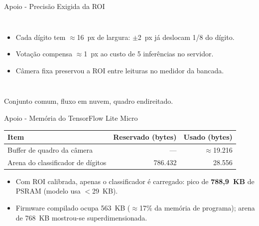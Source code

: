 \documentclass[
    aspectratio=169,
    11pt,
    brazil
]{beamer}
\newcommand{\fonteslide}[1]{\par\vfill{\tiny\color{black!60}#1\par}}
\begin{document}
\begin{frame}{Apoio - Precisão Exigida da ROI}
  \begin{columns}[c]
    \centering
    \begin{itemize}\scriptsize
      \item Cada dígito tem $\approx$16~px de largura: $\pm$2~px já deslocam 1/8 do dígito.
      \item Votação compensa $\approx$1~px ao custo de 5 inferências no servidor.
      \item Câmera fixa preservou a ROI entre leituras no medidor da bancada.
    \end{itemize}
  \end{columns}
  \fonteslide{Conjunto comum, fluxo em nuvem, quadro endireitado.}
\end{frame}

\begin{frame}{Apoio - Memória do TensorFlow Lite Micro}
  \centering
  \scriptsize
  \renewcommand{\arraystretch}{1.2}
  \begin{tabular}{@{}lrr@{}}
    \toprule
    \textbf{Item} & \textbf{Reservado (bytes)} & \textbf{Usado (bytes)} \\
    \midrule
    Buffer de quadro da câmera & --- & $\approx$19.216 \\
    Arena do classificador de dígitos & 786.432 & 28.556 \\
    \bottomrule
  \end{tabular}

  \vspace{0.3cm}
  \begin{itemize}\scriptsize
    \item Com ROI calibrada, apenas o classificador é carregado: pico de \textbf{788,9~KB} de PSRAM (modelo usa $<$29~KB).
    \item Firmware compilado ocupa 563~KB ($\approx$17\% da memória de programa); arena de 768~KB mostrou-se superdimensionada.
  \end{itemize}
\end{frame}
\end{document}
